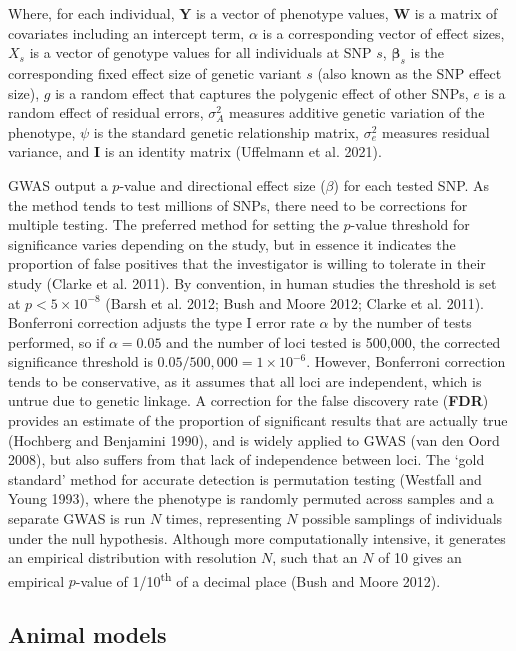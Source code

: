 \documentclass[
]{book}
\begin{document}
Where, for each individual, \(\textbf{Y}\) is a vector of phenotype values, \(\textbf{W}\) is a matrix of covariates including an intercept term, \(\alpha\) is a corresponding vector of effect sizes, \(X_s\) is a vector of genotype values for all individuals at SNP \(s\), \(\boldsymbol{\beta}_s\) is the corresponding fixed effect size of genetic variant \(s\) (also known as the SNP effect size), \(g\) is a random effect that captures the polygenic effect of other SNPs, \(e\) is a random effect of residual errors, \(\sigma^2_{A}\) measures additive genetic variation of the phenotype, \(\psi\) is the standard genetic relationship matrix, \(\sigma^2_e\) measures residual variance, and \(\textbf{I}\) is an identity matrix (Uffelmann et al. 2021).

GWAS output a \(p\)-value and directional effect size (\(\beta\)) for each tested SNP. As the method tends to test millions of SNPs, there need to be corrections for multiple testing. The preferred method for setting the \(p\)-value threshold for significance varies depending on the study, but in essence it indicates the proportion of false positives that the investigator is willing to tolerate in their study (Clarke et al. 2011). By convention, in human studies the threshold is set at \(p < 5 \times 10^{-8}\) (Barsh et al. 2012; Bush and Moore 2012; Clarke et al. 2011). Bonferroni correction adjusts the type I error rate \(\alpha\) by the number of tests performed, so if \(\alpha = 0.05\) and the number of loci tested is 500,000, the corrected significance threshold is \(0.05 / 500,000 = 1\times10^{-6}\). However, Bonferroni correction tends to be conservative, as it assumes that all loci are independent, which is untrue due to genetic linkage. A correction for the false discovery rate (\textbf{FDR}) provides an estimate of the proportion of significant results that are actually true (Hochberg and Benjamini 1990), and is widely applied to GWAS (van den Oord 2008), but also suffers from that lack of independence between loci. The `gold standard' method for accurate detection is permutation testing (Westfall and Young 1993), where the phenotype is randomly permuted across samples and a separate GWAS is run \(N\) times, representing \(N\) possible samplings of individuals under the null hypothesis. Although more computationally intensive, it generates an empirical distribution with resolution \(N\), such that an \(N\) of 10 gives an empirical \(p\)-value of 1/10\textsuperscript{th} of a decimal place (Bush and Moore 2012).

\hypertarget{animal-models}{%
\subsection{Animal models}\label{animal-models}}
\end{document}
